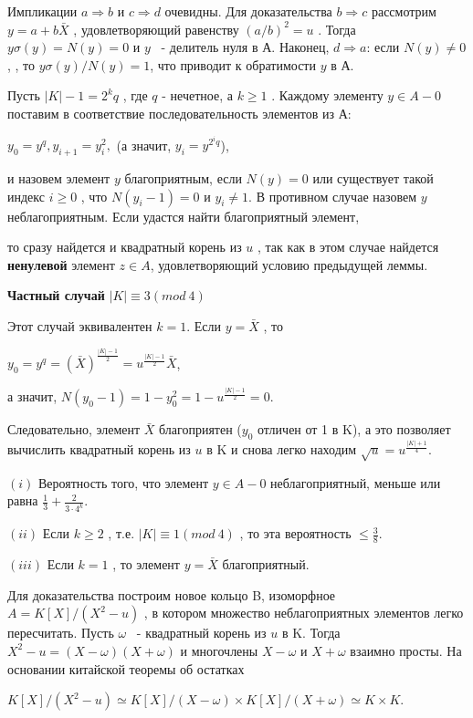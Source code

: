 \documentclass{mai_book}
\begin{document}
\begin{myproof}
Импликации $a \Rightarrow b$
 и $c \Rightarrow d$
 очевидны. Для доказательства $b \Rightarrow c$
 рассмотрим $y = a + b \bar X$
 , удовлетворяющий равенству $(a/b)^2 = u$
. Тогда $y\sigma(y) = N(y) = 0$
 и $y$
 ~- делитель нуля в А. Наконец, $d \Rightarrow a$:
 если $N(y) \not= 0$,
 , то $y\sigma(y)/N(y) = 1$, что приводит к обратимости $y$
 в А.
\end{myproof}
Пусть $|K| - 1 = 2^kq$
, где $q$ - нечетное, а $k \geqslant 1$
. Каждому элементу $y \in A - {0}$
 поставим в соответствие последовательность элементов из А:

\begin{center}
$y_0 = y^q, y_{i+1} = y_i^2,$ (а значит, $y_i = y^{2^iq}$),
\end{center}


и назовем элемент $y$
 благоприятным, если $N(y) = 0$
 или существует такой индекс $i\geqslant 0$
 , что $N(y_i-1) = 0$
 и $y_i \not= 1$. В противном случае назовем $y$
 неблагоприятным. Если удастся найти благоприятный элемент,

\newpage

то сразу найдется и квадратный корень из $u$
, так как в этом случае найдется {\bf ненулевой} элемент $z \in A$, удовлетворяющий условию предыдущей леммы.

{\bf Частный случай} $|K| \equiv 3 (mod \ 4)$

Этот случай эквивалентен $k = 1$. Если $y = \bar X$
, то

\begin{center}
$y_0 = y^q = (\bar X)^{\frac{|K|-1}{2}} = u^{\frac{|K|-1}{2}}\bar X$,

а значит, $N(y_0 -1) = 1 - y^2_0 = 1 - u^{\frac{|K|-1}{2}} = 0$.
\end{center}

Следовательно, элемент $\bar X$
 благоприятен ($y_0$
 отличен от 1 в K), а это позволяет вычислить квадратный корень из $u$
 в K и снова легко находим $\sqrt u = u^{\frac{|K|+1}{4}}$.

\begin{predl}

$(i)$ Вероятность того, что элемент $y \in A - {0}$
 неблагоприятный, меньше или равна $\frac 13 + \frac{2}{3\cdot 4^k}$.

$(ii)$ Если $k\geqslant 2$
 , т.е. $|K| \equiv 1 (mod \ 4)$
, то эта вероятность $\leqslant \frac 38$.

$(iii)$ Если $k = 1$
 , то элемент $y = \bar X$
 благоприятный.

Для доказательства построим новое кольцо B, изоморфное $A = K[X]/(X^2 - u)$
, в котором множество неблагоприятных элементов легко пересчитать. Пусть $\omega$
 ~- квадратный корень из $u$
 в K. Тогда $X^2 - u = (X-\omega)(X+\omega)$
 и многочлены $X - \omega$
 и $X + \omega$
 взаимно просты. На основании китайской теоремы об остатках
\end{predl}
\begin{center}
$K[X]/(X^2 - u) \simeq K[X]/(X-\omega) \times K[X]/(X+\omega) \simeq K \times K$.
\end{center}
\end{document}
